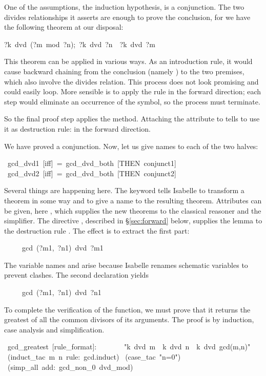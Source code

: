 %
One of the assumptions, the induction hypothesis, is a conjunction. 
The two divides relationships it asserts are enough to prove 
the conclusion, for we have the following theorem at our disposal: 
\begin{isabelle}
\isasymlbrakk?k\ dvd\ (?m\ mod\ ?n){;}\ ?k\ dvd\ ?n\isasymrbrakk\ \isasymLongrightarrow\ ?k\ dvd\ ?m%
\end{isabelle}
%
This theorem can be applied in various ways.  As an introduction rule, it
would cause backward chaining from  the conclusion (namely
) to the two premises, which 
also involve the divides relation. This process does not look promising
and could easily loop.  More sensible is  to apply the rule in the forward
direction; each step would eliminate an occurrence of the  symbol, so the
process must terminate.  

So the final proof step applies the  method.
Attaching the {} attribute to  tells 
to use it as destruction rule: in the forward direction.

\medskip
We have proved a conjunction.  Now, let us give names to each of the
two halves:
\begin{isabelle}
\ gcd_dvd1\ [iff]\ =\ gcd_dvd_both\ [THEN\ conjunct1]\isanewline
{}\ gcd_dvd2\ [iff]\ =\ gcd_dvd_both\ [THEN\ conjunct2]%
\end{isabelle}

Several things are happening here. The keyword 
tells Isabelle to transform a theorem in some way and to
give a name to the resulting theorem.  Attributes can be given,
here , which supplies the new theorems to the classical reasoner
and the simplifier.  The directive ,
described in
\S\ref{sec:forward} below, supplies the lemma 
 to the
destruction rule .  The effect is to extract the first part:
\begin{isabelle}
\ \ \ \ \ gcd\ (?m1,\ ?n1)\ dvd\ ?m1
\end{isabelle}
The variable names  and  arise because
Isabelle renames schematic variables to prevent 
clashes.  The second  declaration yields
\begin{isabelle}
\ \ \ \ \ gcd\ (?m1,\ ?n1)\ dvd\ ?n1
\end{isabelle}

\medskip
To complete the verification of the  function, we must 
prove that it returns the greatest of all the common divisors 
of its arguments.  The proof is by induction, case analysis and simplification.
\begin{isabelle}
\ gcd_greatest\
[rule_format]:\isanewline
\ \ \ \ \ \ \ "k\ dvd\ m\ \isasymlongrightarrow\ k\ dvd\ n\ \isasymlongrightarrow\
k\ dvd\ gcd(m,n)"\isanewline
{}\ (induct_tac\ m\ n\ rule:\ gcd.induct)\isanewline
\isacommand{apply}\ (case_tac\ "n=0")\isanewline
\isacommand{apply}\ (simp_all\ add:\ gcd_non_0\ dvd_mod)\isanewline
\isacommand{done}
\end{isabelle}

